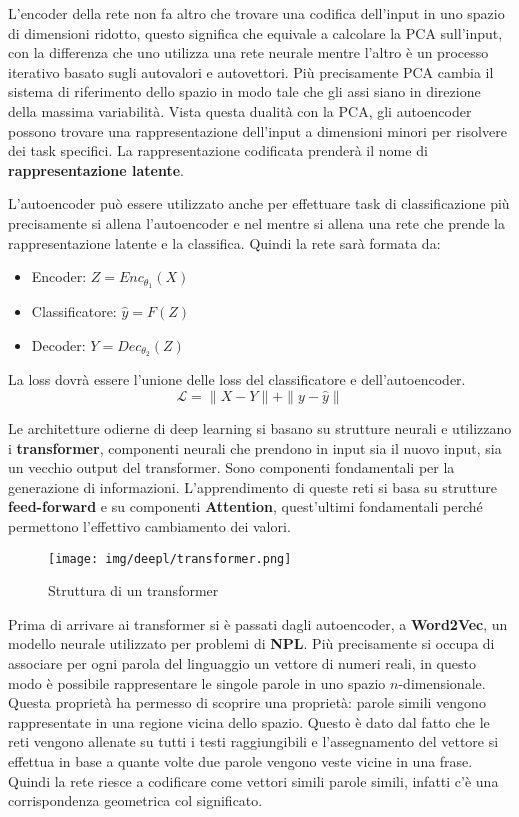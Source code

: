 L'encoder della rete non fa altro che trovare una codifica dell'input in uno
spazio di dimensioni ridotto, questo significa che equivale a calcolare la PCA
sull'input, con la differenza che uno utilizza una rete neurale mentre l'altro
è un processo iterativo basato sugli autovalori e autovettori. Più precisamente
PCA cambia il sistema di riferimento dello spazio in modo tale che gli assi
siano in direzione della massima variabilità. Vista questa dualità con la PCA,
gli autoencoder possono trovare una rappresentazione dell'input a dimensioni
minori per risolvere dei task specifici. La rappresentazione codificata prenderà
il nome di \textbf{rappresentazione latente}.

L'autoencoder può essere utilizzato anche per effettuare task di classificazione
più precisamente si allena l'autoencoder e nel mentre si allena una rete che
prende la rappresentazione latente e la classifica. Quindi la rete sarà formata
da:
\begin{itemize}
      \item Encoder: $Z = Enc_{\theta_1}(X)$
      \item Classificatore: $\hat{y} = F(Z)$
      \item Decoder: $Y = Dec_{\theta_2}(Z)$
\end{itemize}
La loss dovrà essere l'unione delle loss del classificatore e dell'autoencoder.
\begin{equation}
      \mathcal{L} = \| X - Y \| + \| y - \hat{y} \|
\end{equation}

Le architetture odierne di deep learning si basano su strutture neurali e
utilizzano i \textbf{transformer}, componenti neurali che prendono in input sia
il nuovo input, sia un vecchio output del transformer. Sono componenti
fondamentali per la generazione di informazioni. L'apprendimento di queste reti
si basa su strutture \textbf{feed-forward} e su componenti \textbf{Attention},
quest'ultimi fondamentali perché permettono l'effettivo cambiamento dei valori.
\begin{figure}[!ht]
      \centering
      \texttt{[image: img/deepl/transformer.png]}
      \caption{Struttura di un transformer}
      \label{fig:transformer}
\end{figure}
Prima di arrivare ai transformer si è passati dagli autoencoder, a
\textbf{Word2Vec}, un modello neurale utilizzato per problemi di \textbf{NPL}.
Più precisamente si occupa di associare per ogni parola del linguaggio un vettore
di numeri reali, in questo modo è possibile rappresentare le singole parole in
uno spazio $n$-dimensionale. Questa proprietà ha permesso di scoprire una
proprietà: parole simili vengono rappresentate in una regione vicina dello
spazio. Questo è dato dal fatto che le reti vengono allenate su tutti i testi
raggiungibili e l'assegnamento del vettore si effettua in base a quante volte
due parole vengono veste vicine in una frase. Quindi la rete riesce a codificare
come vettori simili parole simili, infatti c'è una corrispondenza geometrica col
significato.

